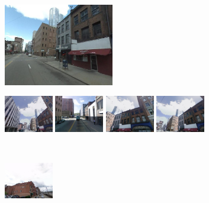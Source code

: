 \vspace{3mm}
\\
\begin{minipage}{0.34\linewidth}
    \centering
    \vspace{0mm}
    \includegraphics[height=36mm]{imgs/ex4/query.jpg}
\end{minipage}
\begin{minipage}{0.75\linewidth}
    \begin{minipage}{\linewidth} 
        \colorbox{myGreen}{\includegraphics[height=16mm]{imgs/ex4/FVsvm1.jpg}}
        \colorbox{myRed}{\includegraphics[height=16mm]{imgs/ex4/FVsvm2.jpg}}
        \colorbox{myGreen}{\includegraphics[height=16mm]{imgs/ex4/FVsvm5.jpg}}
        \colorbox{myGreen}{\includegraphics[height=16mm]{imgs/ex4/FVsvm4.jpg}}
    \end{minipage}
    \\
    \begin{minipage}{\linewidth}
        \colorbox{myRed}{\includegraphics[height=16mm]{imgs/ex4/FV1.jpg}}

\end{minipage}
\end{minipage}
